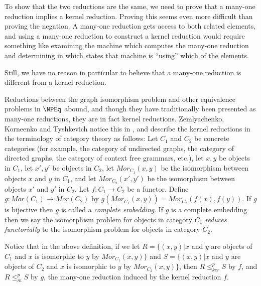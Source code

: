\documentclass{article}
\theoremstyle{definition}
\newcommand{\kr}{\leq^{p}_{ker}} %
\newcommand{\mor}{\leq^{p}_{m}} %
\begin{document}
To show that the two reductions are the same, we need to prove that a many-one
reduction implies a kernel reduction. Proving this seems even more difficult
than proving the negation. A many-one reduction gets access to both related
elements, and using a many-one reduction to construct a kernel reduction would
require something like examining the machine which computes the many-one
reduction and determining in which states that machine is ``using'' which of
the elements.

Still, we have no reason in particular to believe that a many-one reduction is
different from a kernel reduction. %

Reductions between the graph isomorphism problem and other equivalence problems
in $\NPEq$ abound, and though they have traditionally been presented as
many-one reductions, they are in fact kernel reductions. Zemlyachenko,
Korneenko and Tyshkevich notice this in \cite{zkt85}, and describe the kernel
reductions in the terminology of category theory as follows: Let $C_1$ and
$C_2$ be concrete categories (for example, the category of undirected graphs,
the category of directed graphs, the category of context free grammars, etc.),
let $x,y$ be objects in $C_1$, let $x', y'$ be objects in $C_2$, let
$Mor_{C_1}(x,y)$ be the isomorphism between objects $x$ and $y$ in $C_1$, and
let $Mor_{C_2}(x',y')$ be the isomorphism between objects $x'$ and $y'$ in
$C_2$. Let $f:C_1\to C_2$ be a functor. Define $g:Mor(C_1)\to Mor(C_2)$ by
$g(Mor_{C_1}(x,y))=Mor_{C_2}(f(x), f(y))$. If $g$ is bijective then $g$ is
called a \emph{complete embedding}. If $g$ is a complete embedding then we say
the isomorphism problem for objects in category $C_1$ \emph{reduces
  functorially} to the isomorphism problem for objects in category $C_2$.

Notice that in the above definition, if we let $R=\{(x,y)| x$ and $y$ are
objects of $C_1$ and $x$ is isomorphic to $y$ by $Mor_{C_1}(x,y)\}$ and
$S=\{(x,y)| x$ and $y$ are objects of $C_2$ and $x$ is isomorphic to $y$ by
$Mor_{C_2}(x,y)\}$, then $R\kr S$ by $f$, and $R\mor S$ by $g$, the many-one
reduction induced by the kernel reduction $f$.
\end{document}
